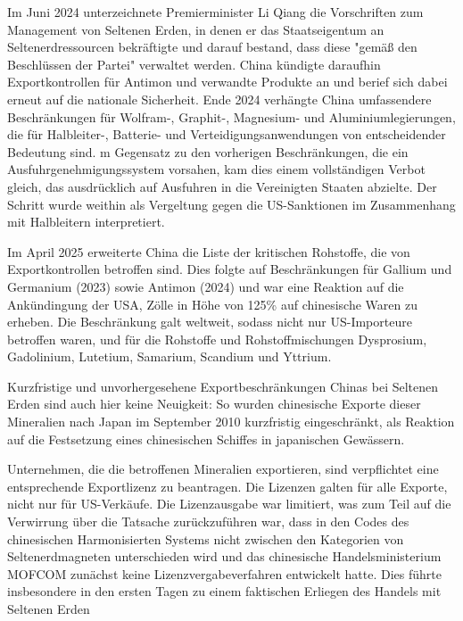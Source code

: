 \documentclass[12pt,a4paper,oneside]{book} %
\begin{document}
Im Juni 2024 unterzeichnete Premierminister Li Qiang die Vorschriften zum Management von Seltenen Erden, in denen er das Staatseigentum an Seltenerdressourcen bekräftigte und darauf bestand, dass diese "gemäß den Beschlüssen der Partei" verwaltet werden. China kündigte daraufhin Exportkontrollen für Antimon und verwandte Produkte an und berief sich dabei erneut auf die nationale Sicherheit. Ende 2024 verhängte China umfassendere Beschränkungen für Wolfram-, Graphit-, Magnesium- und Aluminiumlegierungen, die für Halbleiter-, Batterie- und Verteidigungsanwendungen von entscheidender Bedeutung sind. m Gegensatz zu den vorherigen Beschränkungen, die ein Ausfuhrgenehmigungssystem vorsahen, kam dies einem vollständigen Verbot gleich, das ausdrücklich auf Ausfuhren in die Vereinigten Staaten abzielte. Der Schritt wurde weithin als Vergeltung gegen die US-Sanktionen im Zusammenhang mit Halbleitern interpretiert.

Im April 2025 erweiterte China die Liste der kritischen Rohstoffe, die von Exportkontrollen betroffen sind.\autocite{https://www.reuters.com/world/china/chinas-export-controls-are-curbing-critical-mineral-shipments-world-2025-04-20/} Dies folgte auf Beschränkungen für Gallium und Germanium (2023) sowie Antimon (2024) und war eine Reaktion auf die Ankündingung der USA, Zölle in Höhe von 125\% auf chinesische Waren zu erheben. Die Beschränkung galt weltweit, sodass nicht nur US-Importeure betroffen waren, und für die Rohstoffe und Rohstoffmischungen Dysprosium, Gadolinium, Lutetium, Samarium, Scandium und Yttrium.

Kurzfristige und unvorhergesehene Exportbeschränkungen Chinas bei Seltenen Erden sind auch hier keine Neuigkeit: So wurden chinesische Exporte dieser Mineralien nach Japan im September 2010 kurzfristig eingeschränkt, als Reaktion auf die Festsetzung eines chinesischen Schiffes in japanischen Gewässern.


Unternehmen, die die betroffenen Mineralien exportieren, sind verpflichtet eine entsprechende Exportlizenz zu beantragen.\autocite[Dessen Beantragung veranschlagt sechs Wochen;]{Wolf. Edda: China führt Exportauflagen für kritische Metalle ein, GTAI} Die Lizenzen galten für alle Exporte, nicht nur für US-Verkäufe. Die Lizenzausgabe war limitiert, was zum Teil auf die Verwirrung über die Tatsache zurückzuführen war, dass in den Codes des chinesischen Harmonisierten Systems nicht zwischen den Kategorien von Seltenerdmagneten unterschieden wird und das chinesische Handelsministerium MOFCOM zunächst keine Lizenzvergabeverfahren entwickelt hatte. Dies führte insbesondere in den ersten Tagen zu einem faktischen Erliegen des Handels mit Seltenen Erden
\end{document}
